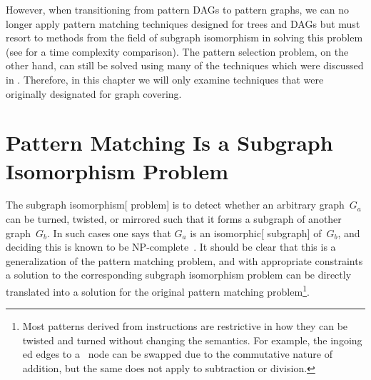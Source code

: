 %

However, when transitioning from \glspl{pattern DAG} to \glspl{pattern graph},
we can no longer apply \gls{pattern matching} techniques designed for
\glspl{tree} and \glspl{DAG} but must resort to methods from the field of
\gls{subgraph isomorphism} in solving this problem (see
 for a time complexity comparison).
%
The
\gls{pattern selection} problem, on the other hand, can still be solved using
many of the techniques which were discussed in
.
%
Therefore, in this chapter we will only examine
techniques that were originally designated for \gls{graph covering}.


\section{Pattern Matching Is a Subgraph Isomorphism Problem}

The \gls{subgraph isomorphism}[ problem] is to detect whether an arbitrary
\gls{graph}~$G_a$ can be turned, twisted, or mirrored such that it forms a
\gls{subgraph} of another \gls{graph}~$G_b$.
%
In such cases one says that $G_a$
is an \gls{isomorphic}[ \gls{subgraph}] of~$G_b$, and deciding this is known to
be NP-complete~\cite{Cook1971}.
%
It should be clear that this is a
generalization of the \gls{pattern matching} problem, and with appropriate
constraints a solution to the corresponding \gls{subgraph isomorphism} problem
can be directly translated into a solution for the original \gls{pattern
  matching} problem\footnote{Most \glspl{pattern} derived from
  \glspl{instruction} are restrictive in how they can be twisted and turned
  without changing the semantics.
%
For example, the \gls{ingoing ed} \glspl{edge}
  to a \gT{$+$}~\gls{node} can be swapped due to the commutative nature of
  addition, but the same does not apply to subtraction or division.}.

